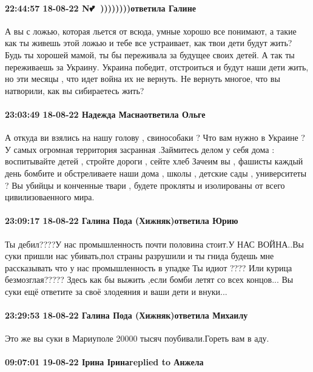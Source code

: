\paragraph{22:44:57 18-08-22 N💕🌹 ))))))))ответила Галине}

А вы с ложью, которая льется от всюда, умные хорошо все понимают, а такие как
ты живешь этой ложью и тебе все устраивает, как твои дети будут жить? Будь ты
хорошей мамой, ты бы переживала за будущее своих детей. А так ты переживаешь за
Украину. Украина победит, отстроиться и будут наши дети жить, но эти месяцы ,
что идет война их не вернуть. Не вернуть многое, что вы натворили, как вы
сибираетесь жить?

\paragraph{23:03:49 18-08-22 Надежда Маснаответила Ольге}

А откуда ви взялись на нашу голову , свинособаки ? Что вам нужно в Украине ? У
самых огромная территория засранная .Займитесь делом у себя дома : воспитывайте
детей , стройте дороги , сейте хлеб Зачеим вы , фашисты каждый день бомбите и
обстреливаете наши дома , школы , детские сады , университеты ? Вы убийцы и
конченные твари , будете прокляты и изолированы от всего цивилизоваенного мира.

\paragraph{23:09:17 18-08-22 Галина Пода (Хижняк)ответила Юрию}

Ты дебил????У нас промышленность почти половина стоит.У НАС ВОЙНА..Вы суки
пришли нас убивать,пол страны разрушили и ты гнида будешь мне рассказывать что
у нас промышленность в упадке Ты идиот ???? Или курица безмозглая????? Здесь
как бы выжить ,если бомби летят со всех концов... Вы суки ещё ответите за своё
злодеяния и ваши дети и внуки...

\paragraph{23:29:53 18-08-22 Галина Пода (Хижняк)ответила Михаилу}

Это же вы суки в Мариуполе 20000 тысяч поубивали.Гореть вам в аду.

\paragraph{09:07:01 19-08-22 Ірина Іринаreplied to Анжела}

